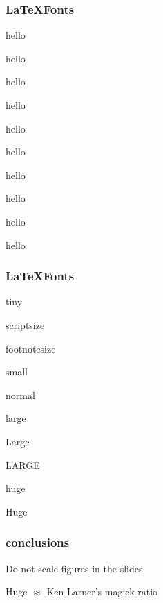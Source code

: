 \begin{frame}\frametitle{\LaTeX Fonts}
\tiny hello

\scriptsize hello

\footnotesize hello

\small hello

\normalsize hello

\large hello

\Large hello

\LARGE hello

\huge hello

\Huge hello
\end{frame}

\begin{frame}\frametitle{\LaTeX Fonts}
\tiny tiny

\scriptsize scriptsize

\footnotesize footnotesize

\small small

\normalsize normal

\large large

\Large Large

\LARGE LARGE 

\huge huge

\Huge Huge

\end{frame}


\usebackgroundtemplate{}

\begin{frame}\frametitle{conclusions}
Do not scale figures in the slides

Huge $\approx$ Ken Larner's magick ratio

\end{frame}
